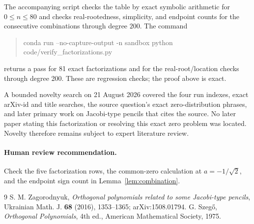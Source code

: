 \documentclass[11pt]{article}
\newcommand{\rt}{\sqrt2}
\begin{document}
The accompanying script checks the table by exact symbolic arithmetic for
$0\leq n\leq80$ and checks real-rootedness, simplicity, and endpoint counts
for the consecutive combinations through degree $200$.  The command
\begin{quote}\small\ttfamily
conda run --no-capture-output -n sandbox python\\
code/verify\_factorizations.py
\end{quote}
returns a pass for 81 exact factorizations and for the real-root/location
checks through degree 200.  These are regression checks; the proof above is
exact.

A bounded novelty search on 21 August 2026 covered the four run indexes,
exact arXiv-id and title searches, the source question's exact zero-distribution
phrases, and later primary work on Jacobi-type pencils that cites the source.
No later paper stating this factorization or resolving this exact zero problem
was located.  Novelty therefore remains subject to expert literature review.

\paragraph{Human review recommendation.}
Check the five factorization rows, the common-zero calculation at
$a=-1/\rt$, and the endpoint sign count in Lemma~\ref{lem:combination}.

\begin{thebibliography}{9}
S. M. Zagorodnyuk,
\emph{Orthogonal polynomials related to some Jacobi-type pencils},
Ukrainian Math. J. \textbf{68} (2016), 1353--1365;
arXiv:1508.01794.
G. Szeg\H{o}, \emph{Orthogonal Polynomials}, 4th ed.,
American Mathematical Society, 1975.
\end{thebibliography}
\end{document}
